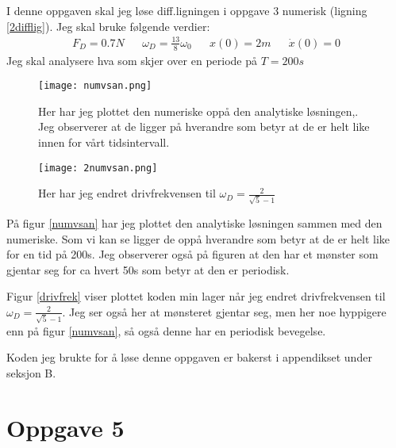 \documentclass[norsk,a4paper,12pt]{article}
\begin{document}
I denne oppgaven skal jeg løse diff.ligningen i oppgave 3 numerisk (ligning \vref{2difflig}). Jeg skal bruke følgende verdier:
\begin{align*}
F_D = 0.7 N && \omega_D = \frac{13}{8}\omega_0 && x(0) = 2 m && \dot{x}(0) = 0
\end{align*}
Jeg skal analysere hva som skjer over en periode på $T = 200s$

\begin{figure}
\centering
	\begin{minipage}{0.8\linewidth}
	\texttt{[image: numvsan.png]}
	\caption[Numerisk mot analytisk plott av faserommet]{Her har jeg plottet den numeriske oppå den analytiske løsningen,. Jeg observerer at de ligger på hverandre som betyr at de er helt like innen for vårt tidsintervall.}
	\label{numvsan}
	\end{minipage}
	\hspace{0.5cm}
	\begin{minipage}{0.8\linewidth}
	\texttt{[image: 2numvsan.png]}
	\caption[Endret drivfrekvensen til $\omega_D=\frac{2}{\sqrt{5}-1}$]{Her har jeg endret drivfrekvensen til $\omega_D=\frac{2}{\sqrt{5}-1}$}
	\label{drivfrek}
	\end{minipage}
\end{figure}

På figur \vref{numvsan} har jeg plottet den analytiske løsningen sammen med den numeriske. Som vi kan se ligger de oppå hverandre som betyr at de er helt like for en tid på 200s. Jeg observerer også på figuren at den har et mønster som gjentar seg for ca hvert 50s som betyr at den er periodisk. 

Figur \vref{drivfrek} viser plottet koden min lager når jeg endret drivfrekvensen til $\omega_D=\frac{2}{\sqrt{5}-1}$. Jeg ser også her at mønsteret gjentar seg, men her noe hyppigere enn på figur \vref{numvsan}, så også denne har en periodisk bevegelse.

Koden jeg brukte for å løse denne oppgaven er bakerst i appendikset under seksjon B.

\section{Oppgave 5}
\end{document}

